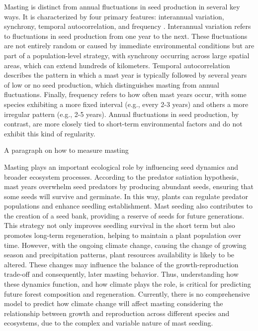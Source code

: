 \documentclass[11pt,letter]{article}
\begin{document}
Masting is distinct from annual fluctuations in seed production in several key ways. It is characterized by four primary features: interannual variation, synchrony, temporal autocorrelation, and frequency \citep{hacket2021climate}. Interannual variation refers to fluctuations in seed production from one year to the next. These fluctuations are not entirely random or caused by immediate environmental conditions but are part of a population-level strategy, with synchrony occurring across large spatial areas, which can extend hundreds of kilometers\citep{kelly1994evolutionary}. Temporal autocorrelation describes the pattern in which a mast year is typically followed by several years of low or no seed production, which distinguishes masting from annual fluctuations. Finally, frequency refers to how often mast years occur, with some species exhibiting a more fixed interval (e.g., every 2-3 years) and others a more irregular pattern (e.g., 2-5 years). Annual fluctuations in seed production, by contrast, are more closely tied to short-term environmental factors and do not exhibit this kind of regularity. \par
A paragraph on how to measure masting\par
Masting plays an important ecological role by influencing seed dynamics and broader ecosystem processes. According to the predator satiation hypothesis, mast years overwhelm seed predators by producing abundant seeds, ensuring that some seeds will survive and germinate. In this way, plants can regulate predator populations and enhance seedling establishment. Mast seeding also contributes to the creation of a seed bank, providing a reserve of seeds for future generations. This strategy not only improves seedling survival in the short term but also promotes long-term regeneration, helping to maintain a plant population over time.
However, with the ongoing climate change, causing the change of growing season and precipitation patterns, plant resources availability is likely to be altered. These changes may influence the balance of the growth-reproduction trade-off and consequently, later masting behavior. Thus, understanding how these dynamics function, and how climate plays the role, is critical for predicting future forest composition and regeneration. Currently, there is no comprehensive model to predict how climate change will affect masting considering the relationship between growth and reproduction across different species and ecosystems, due to the complex and variable nature of mast seeding.\par
\end{document}

